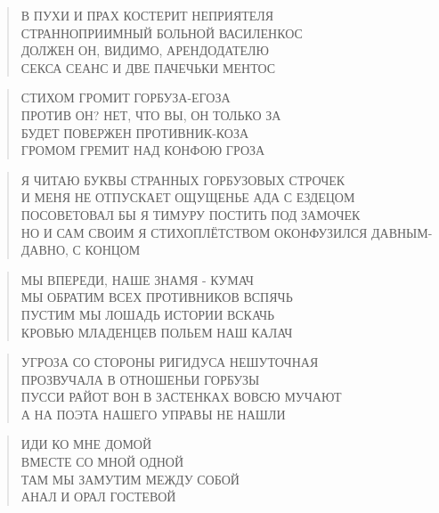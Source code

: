 \poemtitle{***}
\begin{verse}
В ПУХИ И ПРАХ КОСТЕРИТ НЕПРИЯТЕЛЯ\\
СТРАННОПРИИМНЫЙ БОЛЬНОЙ ВАСИЛЕНКОС\\
ДОЛЖЕН ОН, ВИДИМО, АРЕНДОДАТЕЛЮ\\
СЕКСА СЕАНС И ДВЕ ПАЧЕЧЬКИ МЕНТОС
\end{verse}

\poemtitle{***}
\begin{verse}
СТИХОМ ГРОМИТ ГОРБУЗА-ЕГОЗА\\
ПРОТИВ ОН? НЕТ, ЧТО ВЫ, ОН ТОЛЬКО ЗА\\
БУДЕТ ПОВЕРЖЕН ПРОТИВНИК-КОЗА\\
ГРОМОМ ГРЕМИТ НАД КОНФОЮ ГРОЗА
\end{verse}

\poemtitle{***}
\begin{verse}
Я ЧИТАЮ БУКВЫ СТРАННЫХ ГОРБУЗОВЫХ СТРОЧЕК \\
И МЕНЯ НЕ ОТПУСКАЕТ ОЩУЩЕНЬЕ АДА С ЕЗДЕЦОМ\\
ПОСОВЕТОВАЛ БЫ Я ТИМУРУ ПОСТИТЬ ПОД ЗАМОЧЕК\\
НО И САМ СВОИМ Я СТИХОПЛЁТСТВОМ ОКОНФУЗИЛСЯ ДАВНЫМ-ДАВНО, С КОНЦОМ
\end{verse}

\poemtitle{***}
\begin{verse}
МЫ ВПЕРЕДИ, НАШЕ ЗНАМЯ - КУМАЧ\\
МЫ ОБРАТИМ ВСЕХ ПРОТИВНИКОВ ВСПЯЧЬ\\
ПУСТИМ МЫ ЛОШАДЬ ИСТОРИИ ВСКАЧЬ\\
КРОВЬЮ МЛАДЕНЦЕВ ПОЛЬЕМ НАШ КАЛАЧ
\end{verse}

\poemtitle{***}
\begin{verse}
УГРОЗА СО СТОРОНЫ РИГИДУСА НЕШУТОЧНАЯ \\
ПРОЗВУЧАЛА В ОТНОШЕНЬИ ГОРБУЗЫ\\
ПУССИ РАЙОТ ВОН В ЗАСТЕНКАХ ВОВСЮ МУЧАЮТ\\
А НА ПОЭТА НАШЕГО УПРАВЫ НЕ НАШЛИ
\end{verse}

\poemtitle{***}
\begin{verse}
ИДИ КО МНЕ ДОМОЙ \\
ВМЕСТЕ СО МНОЙ ОДНОЙ\\
ТАМ МЫ ЗАМУТИМ МЕЖДУ СОБОЙ\\
АНАЛ И ОРАЛ ГОСТЕВОЙ
\end{verse}

